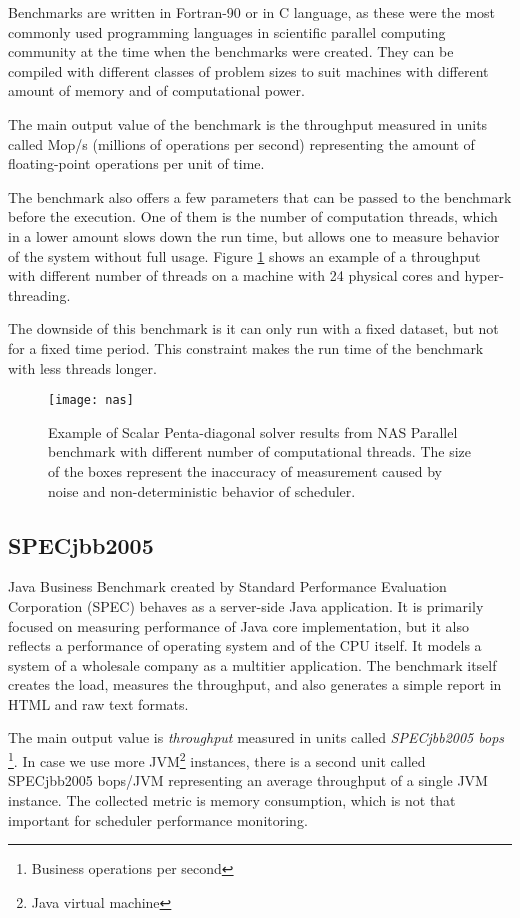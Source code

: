 Benchmarks are written in Fortran-90 or in C language, as these were the most
commonly used programming languages in scientific parallel computing community
at the time when the benchmarks were created. They can be compiled with
different classes of problem sizes to suit machines with different amount of
memory and of computational power.

The main output value of the benchmark is the throughput measured in units
called Mop/s (millions of operations per second) representing the amount of
floating-point operations per unit of time.

The benchmark also offers a few parameters that can be passed to the benchmark
before the execution. One of them is the number of computation threads, which in
a lower amount slows down the run time, but allows one to measure behavior of
the system without full usage. Figure \ref{fig:nas} shows an example of a
throughput with different number of threads on a machine with 24 physical cores
and hyper-threading.

The downside of this benchmark is it can only run with a fixed dataset, but not
for a fixed time period. This constraint makes the run time of the benchmark
with less threads longer.

\begin{figure}
  \centering
  \texttt{[image: nas]}
  \caption{Example of Scalar Penta-diagonal solver results from NAS Parallel
    benchmark with different number of computational threads. The size of the
    boxes represent the inaccuracy of measurement caused by noise and
    non-deterministic behavior of scheduler.}
  \label{fig:nas}
\end{figure}

\subsection{SPECjbb2005}
Java Business Benchmark\;\cite{jbb2005} created by Standard Performance
Evaluation Corporation (SPEC) behaves as a server-side Java application. It is
primarily focused on measuring performance of Java core implementation, but it
also reflects a performance of operating system and of the CPU itself. It models
a system of a wholesale company as a multitier application. The benchmark itself
creates the load, measures the throughput, and also generates a simple report in
HTML and raw text formats.

The main output value is \emph{throughput} measured in units called
\emph{SPECjbb2005 bops} \footnote{Business operations per second}. In case we
use more JVM\footnote{Java virtual machine} instances, there is a second unit
called SPECjbb2005 bops/JVM representing an average throughput of a single JVM
instance. The collected metric is memory consumption, which is not that
important for scheduler performance monitoring.

